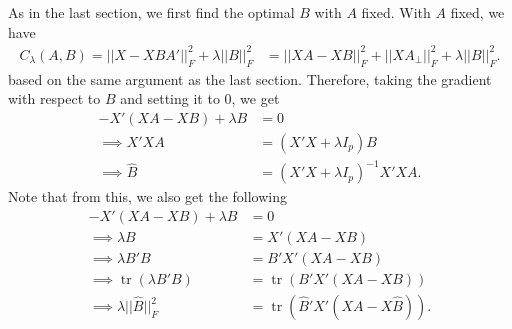 \documentclass[11pt]{article}
\newcommand{\tr}{\operatorname*{tr}}
\begin{document}
As in the last section, we first find the optimal $B$ with $A$ fixed. With $A$ fixed, we have
\begin{align*}
C_\lambda(A, B) =||X - XBA'||_F^2 + \lambda||B||_F^2 &=  ||XA - XB||_F^2 + ||XA_{\bot}||_F^2 + \lambda||B||_F^2.
\end{align*}
based on the same argument as the last section. Therefore, taking the gradient with respect to $B$ and setting it to $0$, we get
\begin{align*}
-X'(XA - XB) + \lambda B &= 0 \\
\implies X'XA &= (X'X + \lambda I_p)B\\
\implies \hat{B} &= (X'X + \lambda I_p)^{-1}X'XA.
\end{align*}
Note that from this, we also get the following
\begin{align*}
-X'(XA - XB) + \lambda B &= 0 \\
\implies \lambda B &= X'(XA - XB) \\
\implies \lambda B'B &= B'X'(XA - XB) \\
\implies \tr(\lambda B'B) &= \tr(B'X'(XA - XB)) \\
\implies \lambda ||\hat{B}||_F^2 &= \tr(\hat{B}'X'(XA - X\hat{B})).
\end{align*}
\end{document}
